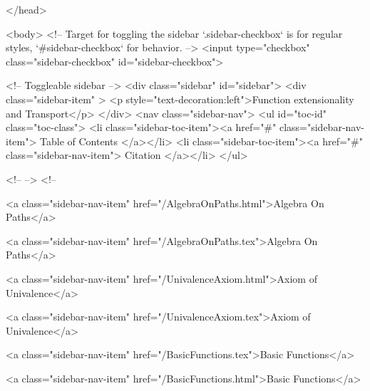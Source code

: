   
</head>




  <body>
    <!-- Target for toggling the sidebar `.sidebar-checkbox` is for regular
     styles, `#sidebar-checkbox` for behavior. -->
<input type="checkbox" class="sidebar-checkbox" id="sidebar-checkbox">

<!-- Toggleable sidebar -->
<div class="sidebar" id="sidebar">
  <div class="sidebar-item" >
    <p style="text-decoration:left">Function extensionality and Transport</p>
  </div>
  <nav class="sidebar-nav">
    <ul id="toc-id" class="toc-class">
  <li class="sidebar-toc-item"><a href="#" class="sidebar-nav-item"> Table of Contents </a></li>
  <li class="sidebar-toc-item"><a href="#" class="sidebar-nav-item"> Citation </a></li>
</ul>


    <!--  -->
    <!-- 
      
    
      
    
      
    
      
        
      
    
      
        
          <a class="sidebar-nav-item" href="/AlgebraOnPaths.html">Algebra On Paths</a>
        
      
    
      
        
          <a class="sidebar-nav-item" href="/AlgebraOnPaths.tex">Algebra On Paths</a>
        
      
    
      
        
          <a class="sidebar-nav-item" href="/UnivalenceAxiom.html">Axiom of Univalence</a>
        
      
    
      
        
          <a class="sidebar-nav-item" href="/UnivalenceAxiom.tex">Axiom of Univalence</a>
        
      
    
      
        
          <a class="sidebar-nav-item" href="/BasicFunctions.tex">Basic Functions</a>
        
      
    
      
        
          <a class="sidebar-nav-item" href="/BasicFunctions.html">Basic Functions</a>
        
      
    
      
        
